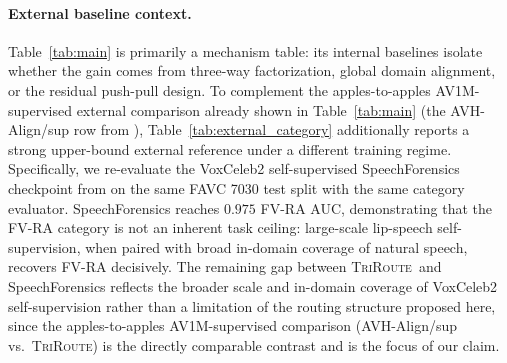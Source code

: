 \documentclass{article}
\newcommand{\method}{\textsc{TriRoute}}
\begin{document}
\paragraph{External baseline context.}
Table~\ref{tab:main} is primarily a mechanism table: its internal baselines isolate whether the gain comes from three-way factorization, global domain alignment, or the residual push-pull design. To complement the apples-to-apples AV1M-supervised external comparison already shown in Table~\ref{tab:main} (the AVH-Align/sup row from \citet{smeu2025avhalign}), Table~\ref{tab:external_category} additionally reports a strong upper-bound external reference under a different training regime. Specifically, we re-evaluate the VoxCeleb2 self-supervised SpeechForensics checkpoint from \citet{liang2024speechforensics} on the same FAVC 7030 test split with the same category evaluator. SpeechForensics reaches $0.975$ FV-RA AUC, demonstrating that the FV-RA category is not an inherent task ceiling: large-scale lip-speech self-supervision, when paired with broad in-domain coverage of natural speech, recovers FV-RA decisively. The remaining gap between \method\ and SpeechForensics reflects the broader scale and in-domain coverage of VoxCeleb2 self-supervision rather than a limitation of the routing structure proposed here, since the apples-to-apples AV1M-supervised comparison (AVH-Align/sup vs.\ \method) is the directly comparable contrast and is the focus of our claim.
\end{document}
